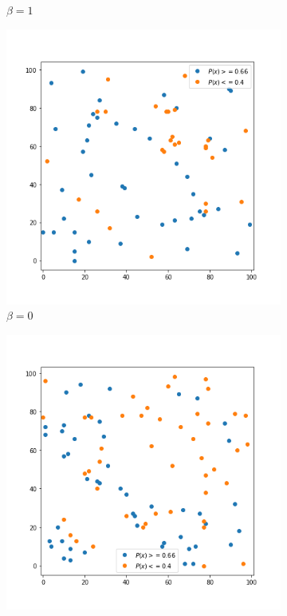 \begin{figure}[!hb]
\begin{subfigure}{0.3\textwidth}
	    \caption{$\beta=1$}
	    \label{fig:21}
	\end{subfigure}
	\begin{subfigure}{.3\textwidth}
    	\centering
    	\includegraphics[width=1\linewidth]{Bilder/simulation_2_3}
    	\caption{$\beta=0$}
    \label{fig:22}
	\end{subfigure}%
		\begin{subfigure}{.3\textwidth}
	    \centering
	    \includegraphics[width=1\linewidth]{Bilder/simulation_3_3}

\end{subfigure}
\end{figure}
